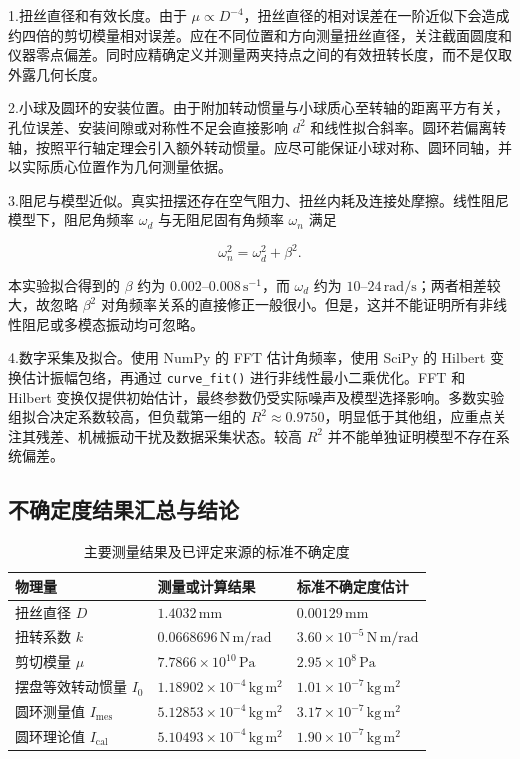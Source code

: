 \documentclass[UTF8]{ctexart}
\begin{document}
1.扭丝直径和有效长度。由于 $\mu\propto D^{-4}$，扭丝直径的相对误差在一阶近似下会造成约四倍的剪切模量相对误差。应在不同位置和方向测量扭丝直径，关注截面圆度和仪器零点偏差。同时应精确定义并测量两夹持点之间的有效扭转长度，而不是仅取外露几何长度。

2.小球及圆环的安装位置。由于附加转动惯量与小球质心至转轴的距离平方有关，孔位误差、安装间隙或对称性不足会直接影响 $d^2$ 和线性拟合斜率。圆环若偏离转轴，按照平行轴定理会引入额外转动惯量。应尽可能保证小球对称、圆环同轴，并以实际质心位置作为几何测量依据。

3.阻尼与模型近似。真实扭摆还存在空气阻力、扭丝内耗及连接处摩擦。线性阻尼模型下，阻尼角频率 $\omega_d$ 与无阻尼固有角频率 $\omega_n$ 满足

\begin{equation}
 \omega_n^2=\omega_d^2+\beta^2.
\end{equation}

本实验拟合得到的 $\beta$ 约为 $0.002$--$0.008\,\mathrm{s^{-1}}$，而 $\omega_d$ 约为 $10$--$24\,\mathrm{rad/s}$；两者相差较大，故忽略 $\beta^2$ 对角频率关系的直接修正一般很小。但是，这并不能证明所有非线性阻尼或多模态振动均可忽略。

4.数字采集及拟合。使用 NumPy 的 FFT 估计角频率，使用 SciPy 的 Hilbert 变换估计振幅包络，再通过 \texttt{curve\_fit()} 进行非线性最小二乘优化。FFT 和 Hilbert 变换仅提供初始估计，最终参数仍受实际噪声及模型选择影响。多数实验组拟合决定系数较高，但负载第一组的 $R^2\approx0.9750$，明显低于其他组，应重点关注其残差、机械振动干扰及数据采集状态。较高 $R^2$ 并不能单独证明模型不存在系统偏差。

\subsection{不确定度结果汇总与结论}

\begin{table}[H]
\centering
\small
\caption{主要测量结果及已评定来源的标准不确定度}
\begin{tabular}{|l|l|l|}
\hline
物理量 & 测量或计算结果 & 标准不确定度估计 \\ \hline
扭丝直径 $D$ & $1.4032\,\mathrm{mm}$ & $0.00129\,\mathrm{mm}$ \\ \hline
扭转系数 $k$ & $0.0668696\,\mathrm{N\,m/rad}$ & $3.60\times10^{-5}\,\mathrm{N\,m/rad}$ \\ \hline
剪切模量 $\mu$ & $7.7866\times10^{10}\,\mathrm{Pa}$ & $2.95\times10^8\,\mathrm{Pa}$ \\ \hline
摆盘等效转动惯量 $I_0$ & $1.18902\times10^{-4}\,\mathrm{kg\,m^2}$ & $1.01\times10^{-7}\,\mathrm{kg\,m^2}$ \\ \hline
圆环测量值 $I_{\mathrm{mes}}$ & $5.12853\times10^{-4}\,\mathrm{kg\,m^2}$ & $3.17\times10^{-7}\,\mathrm{kg\,m^2}$ \\ \hline
圆环理论值 $I_{\mathrm{cal}}$ & $5.10493\times10^{-4}\,\mathrm{kg\,m^2}$ & $1.90\times10^{-7}\,\mathrm{kg\,m^2}$ \\ \hline
\end{tabular}
\end{table}
\end{document}
